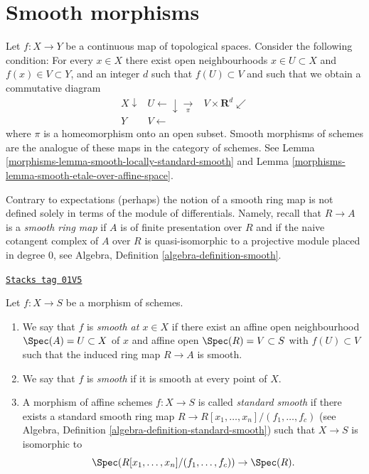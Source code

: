 \section{Smooth morphisms}
\label{morphisms-section-smooth}
Let $f : X \to Y$ be a continuous map of topological spaces.
Consider the following condition:
For every $x \in X$ there exist open neighbourhoods
$x \in U \subset X$ and $f(x) \in V \subset Y$, and an integer $d$
such that $f(U) \subset V$ and such that we obtain
a commutative diagram
$$
\begin{array}{ccc}X \downarrow & U \longleftarrow\downarrow\underset{\pi}{\longrightarrow} & V \times \mathbf{R}^d \swarrow \\ Y & V \longleftarrow & \end{array}
$$
where $\pi$ is a homeomorphism onto an open subset.
Smooth morphisms of schemes are the analogue of these maps
in the category of schemes. See
Lemma \ref{morphisms-lemma-smooth-locally-standard-smooth}
and
Lemma \ref{morphisms-lemma-smooth-etale-over-affine-space}.

\medskip\noindent
Contrary to expectations (perhaps) the notion
of a smooth ring map is not defined solely in terms
of the module of differentials. Namely, recall that
$R \to A$ is a {\it smooth ring map} if $A$ is of finite presentation over $R$
and if the naive cotangent complex of $A$ over $R$ is quasi-isomorphic
to a projective module placed in degree $0$, see
Algebra, Definition \ref{algebra-definition-smooth}.

\begin{definition}[Smooth]
\label{morphisms-definition-smooth}
\href{https://stacks.math.columbia.edu/tag/01V5}{\texttt{Stacks tag 01V5}}

Let $f : X \to S$ be a morphism of schemes.
\begin{enumerate}
\item We say that $f$ is {\it smooth at $x \in X$} if
there exist an affine open neighbourhood $\Spec(A) = U \subset X$
of $x$ and affine open $\Spec(R) = V \subset S$
with $f(U) \subset V$ such that the induced ring map
$R \to A$ is smooth.
\item We say that $f$ is {\it smooth} if it is smooth at every point of $X$.
\item A morphism of affine schemes $f : X \to S$
is called {\it standard smooth} if there exists a standard smooth ring
map $R \to R[x_1, \ldots, x_n]/(f_1, \ldots, f_c)$ (see
Algebra, Definition \ref{algebra-definition-standard-smooth})
such that $X \to S$ is isomorphic to
$$
\Spec(R[x_1, \ldots, x_n]/(f_1, \ldots, f_c)) \to \Spec(R).
$$
\end{enumerate}
\end{definition}

